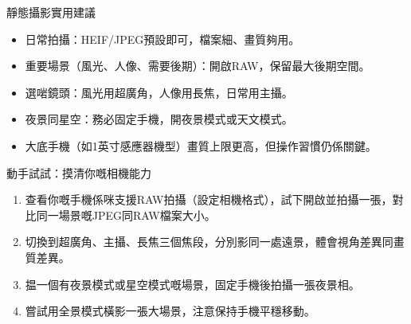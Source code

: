 \begin{tcbinfo}{靜態攝影實用建議}
\begin{itemize}
  \item 日常拍攝：HEIF/JPEG預設即可，檔案細、畫質夠用。
  \item 重要場景（風光、人像、需要後期）：開啟RAW，保留最大後期空間。
  \item 選啱鏡頭：風光用超廣角，人像用長焦，日常用主攝。
  \item 夜景同星空：務必固定手機，開夜景模式或天文模式。
  \item 大底手機（如1英寸感應器機型）畫質上限更高，但操作習慣仍係關鍵。
\end{itemize}

\end{tcbinfo}

\begin{tcbpractice}{動手試試：摸清你嘅相機能力}
\begin{enumerate}
  \item 查看你嘅手機係咪支援RAW拍攝（設定相機格式），試下開啟並拍攝一張，對比同一場景嘅JPEG同RAW檔案大小。
  \item 切換到超廣角、主攝、長焦三個焦段，分別影同一處遠景，體會視角差異同畫質差異。
  \item 揾一個有夜景模式或星空模式嘅場景，固定手機後拍攝一張夜景相。
  \item 嘗試用全景模式橫影一張大場景，注意保持手機平穩移動。
\end{enumerate}

\end{tcbpractice}
